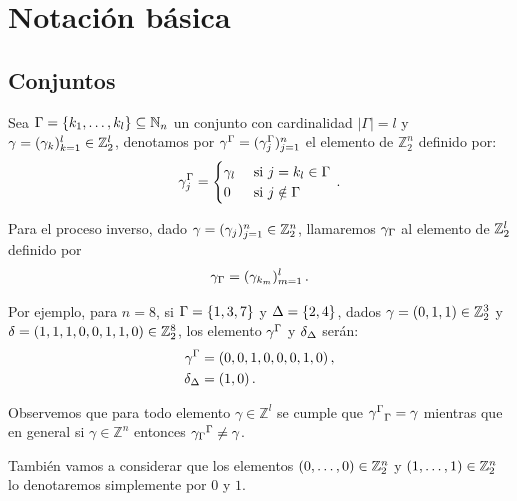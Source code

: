 \section{Notación básica}
\subsection{Conjuntos}
Sea $\Gamma=\{k_1,\dots,k_l\}\subseteq\mathbb{N}_n$ un conjunto con cardinalidad $|\Gamma|=l$ y $\gamma=(\gamma_{k})_{k=1}^l\in\mathbb{Z}_2^l$, denotamos por ${\gamma}^{\Gamma}=({\gamma}^{\Gamma}_j)_{j=1}^n$ el elemento de $\mathbb{Z}_2^n$ definido por:
\begin{equation}
  \label{eq:vector_extendido}
  {\gamma}^{\Gamma}_j=
  \begin{cases}
    \gamma_l & \text{ si } j =k_l\in\Gamma \\
    0        & \text{ si }j\notin\Gamma
  \end{cases}\,.
\end{equation}

Para el proceso inverso, dado $\gamma=(\gamma_{j})_{j=1}^n\in\mathbb{Z}_2^n$, llamaremos ${\gamma}_{\Gamma}$ al elemento de $\mathbb{Z}_2^l$ definido por
\begin{equation}
  \label{eq:vector_reducido}
  {\gamma}_{\Gamma}=(\gamma_{k_m})_{m=1}^l\,.
\end{equation}


Por ejemplo, para $n=8$, si $\Gamma = \{1, 3, 7\}$ y $\Delta = \{2, 4\}$, dados $\gamma = (0,1,1)\in\mathbb{Z}_2^3$ y $\delta = (1, 1, 1, 0, 0, 1, 1, 0)\in\mathbb{Z}_2^8$, los elemento ${\gamma}^{\Gamma}$ y ${\delta}_{\Delta}$ serán:
\begin{align*}
  {\gamma}^{\Gamma} & = (0, 0, 1, 0, 0, 0, 1, 0)\,, \\
  {\delta}_{\Delta} & = (1, 0)\,.
\end{align*}


Observemos que para todo elemento $\gamma\in\mathbb{Z}^l$ se cumple que ${{\gamma}^{\Gamma}}_{\Gamma}=\gamma$ mientras que en general si $\gamma\in\mathbb{Z}^n$ entonces ${{\gamma}_{\Gamma}}^{\Gamma}\neq\gamma$.

También vamos a considerar que los elementos $(0,\dots,0)\in\mathbb{Z}_2^n$ y $(1,\dots,1)\in\mathbb{Z}_2^n$ lo denotaremos simplemente por $0$ y $1$.
